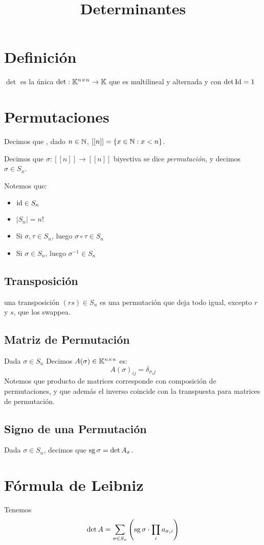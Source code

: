 \documentclass{article}
\title{Determinantes}
\begin{document}
	\maketitle
\section*{Definición}
	$\det$ es la única $\det : \mathbb{K}^{n \times n} \to \mathbb{K}$ que es multilineal y alternada y con $\det \operatorname{Id} = 1$


\section*{Permutaciones}
Decimos que , dado $n \in \mathbb{N}$, $[[n]] = \{x \in \mathbb{N} : x < n\}$.

Decimos que $\sigma : [[n]] \to [[n]]$ biyectiva se dice \emph{permutación}, y decimos $\sigma \in S_n$.

Notemos que:
\begin{itemize}
	\item $\operatorname{id} \in S_n$
	\item $|S_n| = n!$
	\item Si $\sigma, \tau \in S_n$, luego $\sigma \circ \tau \in S_n$
	\item Si $\sigma \in S_n$, luego $\sigma^{-1} \in S_n$
\end{itemize}

\subsection*{Transposición}
una transposición $(rs) \in S_n$ es una permutación que deja todo igual, excepto $r$ y $s$, que los swappea.

\subsection*{Matriz de Permutación}
Dada $\sigma \in S_n$ Decimos $A(\sigma) \in \mathbb{K}^{n \times n}$ es:
\[A(\sigma)_{ij} = \delta_{\sigma_ij}\]
Notemos que producto de matrices corresponde con composición de permutaciones, y que además el inverso coincide con la transpuesta para matrices de permutación.

\subsection*{Signo de una Permutación}
Dada $\sigma \in S_n$, decimos que $\operatorname{sg} \sigma = \det A_\sigma$.

\section*{Fórmula de Leibniz}
Tenemos
\[\det A = \sum_{\sigma \in S_n} \left(\operatorname{sg} \sigma \cdot \prod_i a_{\sigma_ii}\right)\]
\end{document}
